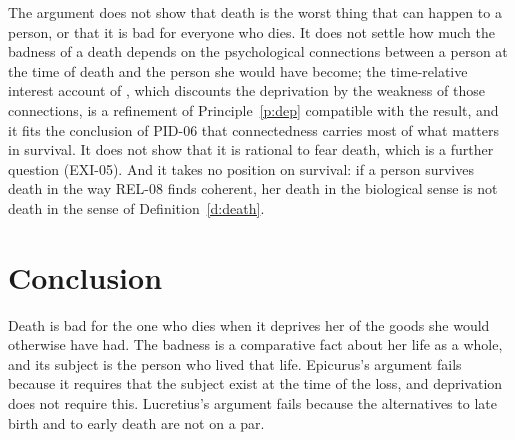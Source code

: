 \documentclass{situationist-preprint}
\begin{document}
The argument does not show that death is the worst thing that can happen to a person, or that it is bad for everyone who dies. It does not settle how much the badness of a death depends on the psychological connections between a person at the time of death and the person she would have become; the time-relative interest account of \citet{McMahan2002}, which discounts the deprivation by the weakness of those connections, is a refinement of Principle~\ref{p:dep} compatible with the result, and it fits the conclusion of PID-06 that connectedness carries most of what matters in survival. It does not show that it is rational to fear death, which is a further question (EXI-05). And it takes no position on survival: if a person survives death in the way REL-08 finds coherent, her death in the biological sense is not death in the sense of Definition~\ref{d:death}.

\section{Conclusion}

Death is bad for the one who dies when it deprives her of the goods she would otherwise have had. The badness is a comparative fact about her life as a whole, and its subject is the person who lived that life. Epicurus's argument fails because it requires that the subject exist at the time of the loss, and deprivation does not require this. Lucretius's argument fails because the alternatives to late birth and to early death are not on a par.
\end{document}
